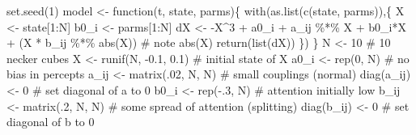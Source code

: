 \documentclass[
  a4paper,
  DIV=11,
  numbers=noendperiod,
  oneside]{scrreprt}
\newenvironment{Shaded}{}{}
\newcommand{\CommentTok}[1]{\textcolor[rgb]{0.42,0.45,0.49}{#1}}
\newcommand{\ControlFlowTok}[1]{\textcolor[rgb]{0.84,0.23,0.29}{#1}}
\newcommand{\DecValTok}[1]{\textcolor[rgb]{0.00,0.36,0.77}{#1}}
\newcommand{\FloatTok}[1]{\textcolor[rgb]{0.00,0.36,0.77}{#1}}
\newcommand{\FunctionTok}[1]{\textcolor[rgb]{0.44,0.26,0.76}{#1}}
\newcommand{\NormalTok}[1]{\textcolor[rgb]{0.14,0.16,0.18}{#1}}
\newcommand{\OtherTok}[1]{\textcolor[rgb]{0.44,0.26,0.76}{#1}}
\newcommand{\SpecialCharTok}[1]{\textcolor[rgb]{0.00,0.36,0.77}{#1}}
\begin{document}
\begin{Shaded}
\begin{Highlighting}[]
\FunctionTok{set.seed}\NormalTok{(}\DecValTok{1}\NormalTok{)}
\NormalTok{model }\OtherTok{\textless{}{-}} \ControlFlowTok{function}\NormalTok{(t, state, parms)\{}
  \FunctionTok{with}\NormalTok{(}\FunctionTok{as.list}\NormalTok{(}\FunctionTok{c}\NormalTok{(state, parms)),\{}
\NormalTok{    X }\OtherTok{\textless{}{-}}\NormalTok{ state[}\DecValTok{1}\SpecialCharTok{:}\NormalTok{N]}
\NormalTok{    b0\_i }\OtherTok{\textless{}{-}}\NormalTok{ parms[}\DecValTok{1}\SpecialCharTok{:}\NormalTok{N]}
\NormalTok{    dX }\OtherTok{\textless{}{-}} \SpecialCharTok{{-}}\NormalTok{X}\SpecialCharTok{\^{}}\DecValTok{3} \SpecialCharTok{+}\NormalTok{ a0\_i }\SpecialCharTok{+}\NormalTok{ a\_ij }\SpecialCharTok{\%*\%}\NormalTok{ X }\SpecialCharTok{+}\NormalTok{ b0\_i}\SpecialCharTok{*}\NormalTok{X }\SpecialCharTok{+} 
\NormalTok{      (X }\SpecialCharTok{*}\NormalTok{ b\_ij }\SpecialCharTok{\%*\%}  \FunctionTok{abs}\NormalTok{(X))  }\CommentTok{\# note abs(X)}
    \FunctionTok{return}\NormalTok{(}\FunctionTok{list}\NormalTok{(dX))}
\NormalTok{  \})}
\NormalTok{\}}
\NormalTok{N }\OtherTok{\textless{}{-}} \DecValTok{10} \CommentTok{\# 10 necker cubes}
\NormalTok{X }\OtherTok{\textless{}{-}} \FunctionTok{runif}\NormalTok{(N, }\SpecialCharTok{{-}}\FloatTok{0.1}\NormalTok{, }\FloatTok{0.1}\NormalTok{) }\CommentTok{\# initial state of X}
\NormalTok{a0\_i }\OtherTok{\textless{}{-}} \FunctionTok{rep}\NormalTok{(}\DecValTok{0}\NormalTok{, N) }\CommentTok{\# no  bias in percepts}
\NormalTok{a\_ij }\OtherTok{\textless{}{-}} \FunctionTok{matrix}\NormalTok{(.}\DecValTok{02}\NormalTok{, N, N) }\CommentTok{\# small couplings (normal)}
\FunctionTok{diag}\NormalTok{(a\_ij) }\OtherTok{\textless{}{-}}  \DecValTok{0} \CommentTok{\# set diagonal of a to 0}
\NormalTok{b0\_i }\OtherTok{\textless{}{-}} \FunctionTok{rep}\NormalTok{(}\SpecialCharTok{{-}}\NormalTok{.}\DecValTok{3}\NormalTok{, N) }\CommentTok{\# attention initially low}
\NormalTok{b\_ij }\OtherTok{\textless{}{-}} \FunctionTok{matrix}\NormalTok{(.}\DecValTok{2}\NormalTok{, N, N) }\CommentTok{\# some spread of attention (splitting)}
\FunctionTok{diag}\NormalTok{(b\_ij) }\OtherTok{\textless{}{-}} \DecValTok{0} \CommentTok{\# set diagonal of b to 0}


\end{Highlighting}
\end{Shaded}
\end{document}
